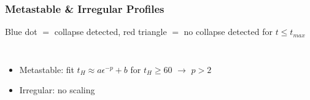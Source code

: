 \documentclass[mathserif,10pt]{beamer}
\newcommand{\bi}{\begin{itemize}}
\newcommand{\ei}{\end{itemize}}
\newcommand{\its}{\item}
\begin{document}
{\frame
{
  \frametitle{Metastable \& Irregular Profiles}
  \begin{center}
  Blue dot $=$ collapse detected, red triangle $=$ no collapse detected for $t \leq t_{max}$
  \end{center}
  \vspace{-0.1in}
  \begin{columns}
    \vspace{-0.25in}
    \bi
    \its Metastable: fit $t_H \approx a \epsilon^{-p} + b$ for $t_H \geq 60$ $\to$ $p > 2$
    \its<2->{Irregular: no scaling}
    \ei
    \begin{figure}
      \centering

\end{figure}
\end{columns}}}
\end{document}
